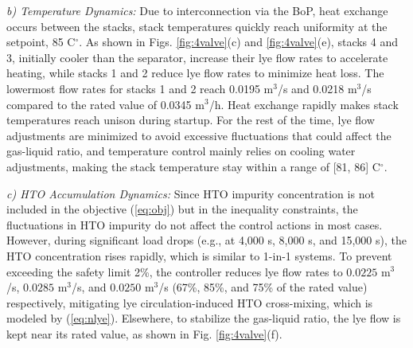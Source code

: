 \documentclass[review,3p,10pt]{elsarticle}
\begin{document}
\emph{b) Temperature Dynamics:} %
Due to interconnection via the BoP, heat exchange occurs between the stacks, %
stack temperatures quickly reach uniformity at the setpoint, 85 C$^\circ$. As shown in Figs. \ref{fig:4valve}(c) and \ref{fig:4valve}(e), stacks 4 and 3, initially cooler than the separator, increase their lye flow rates to accelerate heating, while stacks 1 and 2 reduce lye flow rates to minimize heat loss. The lowermost flow rates for stacks 1 and 2 reach 0.0195 m$^3$/s and 0.0218 m$^3$/s compared to the rated value of 0.0345 m$^3$/h. Heat exchange rapidly makes stack temperatures reach unison during startup. %
For the rest of the time, lye flow adjustments are minimized to avoid excessive fluctuations that could affect the gas-liquid ratio, %
and temperature control mainly relies on cooling water adjustments, %
making the stack temperature stay within a range of [81, 86] C$^\circ$.


\emph{c) HTO Accumulation Dynamics:} Since HTO impurity concentration is not included in the objective (\ref{eq:obj}) but in the inequality constraints, the fluctuations in HTO impurity do not affect the control actions in most cases. 
However, during significant load drops (e.g., at 4,000 s, 8,000 s, and 15,000 s), the HTO concentration rises rapidly, which is similar to 1-in-1 systems. 
To prevent exceeding the safety limit 2\%, the controller reduces lye flow rates to $0.0225$ m$^3$/s, $0.0285$ m$^3$/s, and $0.0250$ m$^3$/s (67\%, 85\%, and 75\% of the rated value) respectively, mitigating lye circulation-induced HTO cross-mixing, which is modeled by (\ref{eq:nlye}). Elsewhere, to stabilize the gas-liquid ratio, the lye flow is kept near its rated value, as shown in Fig. \ref{fig:4valve}(f).
\end{document}
